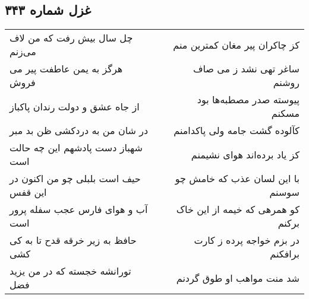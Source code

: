 \begin{center}
\section*{غزل شماره ۳۴۳}
\label{sec:sh343}
\begin{longtable}{l p{0.5cm} r}
چل سال بیش رفت که من لاف می‌زنم
&&
کز چاکران پیر مغان کمترین منم
\\
هرگز به یمن عاطفت پیر می فروش
&&
ساغر تهی نشد ز می صاف روشنم
\\
از جاه عشق و دولت رندان پاکباز
&&
پیوسته صدر مصطبه‌ها بود مسکنم
\\
در شان من به دردکشی ظن بد مبر
&&
کآلوده گشت جامه ولی پاکدامنم
\\
شهباز دست پادشهم این چه حالت است
&&
کز یاد برده‌اند هوای نشیمنم
\\
حیف است بلبلی چو من اکنون در این قفس
&&
با این لسان عذب که خامش چو سوسنم
\\
آب و هوای فارس عجب سفله پرور است
&&
کو همرهی که خیمه از این خاک برکنم
\\
حافظ به زیر خرقه قدح تا به کی کشی
&&
در بزم خواجه پرده ز کارت برافکنم
\\
تورانشه خجسته که در من یزید فضل
&&
شد منت مواهب او طوق گردنم
\\
\end{longtable}
\end{center}
